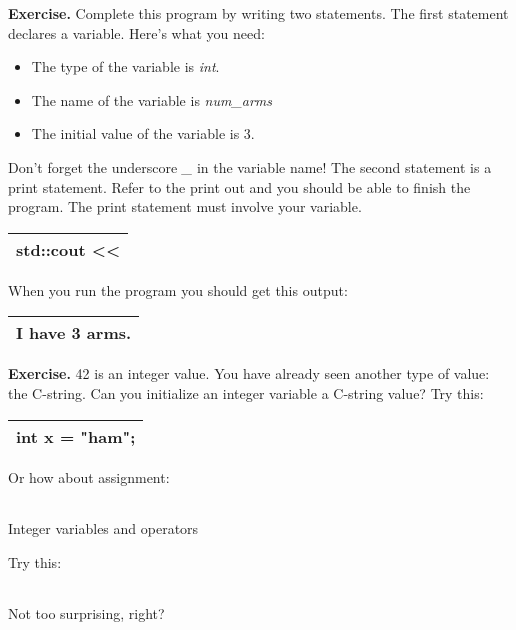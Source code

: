 \documentclass[
]{article}
\providecommand{\tightlist}{%
  \setlength{\itemsep}{0pt}\setlength{\parskip}{0pt}}
\begin{document}
\textbf{Exercise.} Complete this program by writing two statements. The
first statement declares a variable. Here's what you need:

\begin{itemize}
\tightlist
\item
  The type of the variable is \emph{int}.
\item
  The name of the variable is \emph{num\_arms}
\item
  The initial value of the variable is 3.
\end{itemize}

Don't forget the underscore \emph{\_} in the variable name! The second
statement is a print statement. Refer to the print out and you should be
able to finish the program. The print statement must involve your
variable.

\begin{longtable}[]{@{}l@{}}
\toprule
\endhead
\begin{minipage}[t]{0.97\columnwidth}\raggedright
std::cout \textless\textless{} \strut
\end{minipage}\tabularnewline
\bottomrule
\end{longtable}

When you run the program you should get this output:

\begin{longtable}[]{@{}l@{}}
\toprule
\endhead
I have 3 arms.\tabularnewline
\bottomrule
\end{longtable}

\textbf{Exercise.} 42 is an integer value. You have already seen another
type of value: the C-string. Can you initialize an integer variable a
C-string value? Try this:

\begin{longtable}[]{@{}l@{}}
\toprule
\endhead
int x = "ham";\tabularnewline
\bottomrule
\end{longtable}

Or how about assignment:

\begin{longtable}[]{@{}@{}}
\toprule
\endhead
\bottomrule
\end{longtable}

Integer variables and operators

Try this:

\begin{longtable}[]{@{}@{}}
\toprule
\endhead
\bottomrule
\end{longtable}

Not too surprising, right?
\end{document}
